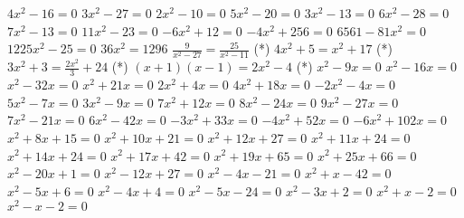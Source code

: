 \documentclass[twocolumns,12pt,addpoints,x11names]{exam}
\begin{document}
\begin{multicols}{2}
\begin{questions}
  \question $4x^{2}-16=0$
  \question $3x^{2}-27=0$
  \question $2x^{2}-10=0$
  \question $5x^{2}-20=0$
  \question $3x^{2}-13=0$
  \question $6x^{2}-28=0$
  \question $7x^{2}-13=0$
  \question $11x^{2}-23=0$
  \question $-6x^{2}+12=0$
  \question $-4x^{2}+256=0$
  \question $6561-81x^{2}=0$
  \question $1225x^{2}-25=0$
  \question $36x^{2}=1296$
  \question $\frac{9}{x^2-27}=\frac{25}{x^2-11}$ (*)
  \question $4x^2+5=x^{2}+17$ (*)
  \question $3x^2+3=\frac{2x^2}{3}+24$ (*)
  \question $(x+1)(x-1)=2x^2-4$ (*)
  \question $x^{2}-9x=0$
  \question $x^{2}-16x=0$
  \question $x^{2}-32x=0$
  \question $x^{2}+21x=0$
  \question $2x^{2}+4x=0$
  \question $4x^{2}+18x=0$
  \question $-2x^{2}-4x=0$
  \question $5x^{2}-7x=0$
  \question $3x^{2}-9x=0$
  \question $7x^{2}+12x=0$
  \question $8x^{2}-24x=0$
  \question $9x^{2}-27x=0$
  \question $7x^{2}-21x=0$
  \question $6x^{2}-42x=0$
  \question $-3x^{2}+33x=0$
  \question $-4x^{2}+52x=0$
  \question $-6x^{2}+102x=0$
  \question $x^{2}+8x+15=0$
  \question $x^{2}+10x+21=0$
  \question $x^{2}+12x+27=0$
  \question $x^{2}+11x+24=0$
  \question $x^{2}+14x+24=0$
  \question $x^{2}+17x+42=0$
  \question $x^{2}+19x+65=0$
  \question $x^{2}+25x+66=0$
  \question $x^{2}-20x+1=0$
  \question $x^{2}-12x+27=0$
  \question $x^{2}-4x-21=0$
  \question $x^{2}+x-42=0$
  \question $x^{2}-5x+6=0$
  \question $x^{2}-4x+4=0$
  \question $x^{2}-5x-24=0$
  \question $x^{2}-3x+2=0$
  \question $x^{2}+x-2=0$
  \question $x^{2}-x-2=0$

\end{questions}
\end{multicols}
\end{document}

